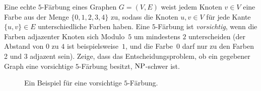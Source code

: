 \documentclass{uebung_cs}
\begin{document}
\begin{exercise}[Vorsichtige Färbung][\projekt\note]
	Eine echte $5$-Färbung eines Graphen $G = (V,E)$ weist jedem Knoten ${v \in V}$ eine Farbe aus der Menge $\{0,1,2,3,4\}$ zu, sodass die Knoten $u,v \in V$ für jede Kante $\{u,v\} \in E$ unterschiedliche Farben haben. Eine $5$-Färbung ist \textit{vorsichtig}, wenn die Farben adjazenter Knoten sich Modulo~$5$ um mindestens $2$ unterscheiden (der Abstand von $0$ zu $4$ ist beispielsweise~$1$, und die Farbe~0 darf nur zu den Farben 2 und 3 adjazent sein). Zeige, dass das Entscheidungsproblem, ob ein gegebener Graph eine vorsichtige $5$-Färbung besitzt, $\mathrm{NP}$-schwer ist.
	
	
	\begin{figure}[ht]
	\begin{center}
        \caption{Ein Beispiel für eine vorsichtige $5$-Färbung.}
	\end{center}
	\end{figure}
\end{exercise}
\end{document}
